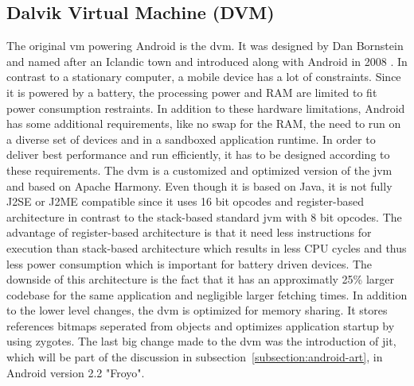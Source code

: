 \subsection{Dalvik Virtual Machine (DVM)} \label{subsection:android-dalvik}
The original \gls{vm} powering Android is the \gls{dvm}.
It was designed by Dan Bornstein and named after an Iclandic town and introduced along with Android in 2008 \cite{developersRelease}.
\newline
In contrast to a stationary computer, a mobile device has a lot of constraints.
Since it is powered by a battery, the processing power and RAM are limited to fit power consumption restraints.
In addition to these hardware limitations, Android has some additional requirements, like no swap for the RAM, the need to run on a diverse set of devices and in a sandboxed application runtime.
In order to deliver best performance and run efficiently, it has to be designed according to these requirements.
\newline
The \gls{dvm} is a customized and optimized version of the \gls{jvm} and based on Apache Harmony.
Even though it is based on Java, it is not fully J2SE or J2ME compatible since it uses 16 bit opcodes and register-based architecture in contrast to the stack-based standard \gls{jvm} with 8 bit opcodes.
The advantage of register-based architecture is that it need less instructions for execution than stack-based architecture which results in less CPU cycles and thus less power consumption which is important for battery driven devices.
The downside of this architecture is the fact that it has an approximatly 25\% larger codebase for the same application and negligible larger fetching times.
In addition to the lower level changes, the \gls{dvm} is optimized for memory sharing.
It stores references bitmaps seperated from objects and optimizes application startup by using zygotes. \cite{ehringerDalvik} \cite{andevconDalvikART}
\newline
The last big change made to the \gls{dvm} was the introduction of \gls{jit}, which will be part of the discussion in subsection~\ref{subsection:android-art}, in Android version 2.2 "Froyo".
